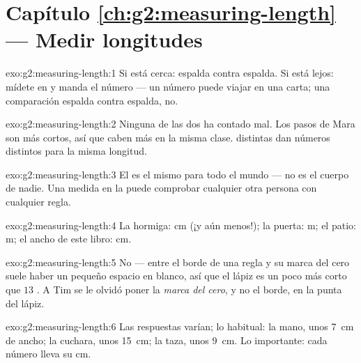 \section*{Capítulo \ref{ch:g2:measuring-length} --- Medir longitudes}

\begin{solution}{exo:g2:measuring-length:1}
Si está cerca: espalda contra espalda. Si está lejos: mídete en
 y manda el número --- un número puede viajar en una
carta; una comparación espalda contra espalda, no.
\end{solution}

\begin{solution}{exo:g2:measuring-length:2}
Ninguna de las dos ha contado mal. Los pasos de Mara son más cortos,
así que caben más en la misma clase.  distintas dan números
distintos para la misma longitud.
\end{solution}

\begin{solution}{exo:g2:measuring-length:3}
El  es el mismo para todo el mundo --- no es el cuerpo de
nadie. Una medida en  la puede comprobar cualquier otra
persona con cualquier regla.
\end{solution}

\begin{solution}{exo:g2:measuring-length:4}
La hormiga: \unit{cm} (¡y aún menos!); la puerta: \unit{m}; el patio:
\unit{m}; el ancho de este libro: \unit{cm}.
\end{solution}

\begin{solution}{exo:g2:measuring-length:5}
No --- entre el borde de una regla y su marca del cero suele haber un
pequeño espacio en blanco, así que el lápiz es un poco más corto que
$13$ . A Tim se le olvidó poner la \emph{marca del cero},
y no el borde, en la punta del lápiz.
\end{solution}

\begin{solution}{exo:g2:measuring-length:6}
Las respuestas varían; lo habitual: la mano, unos \qty{7}{cm} de
ancho; la cuchara, unos \qty{15}{cm}; la taza, unos \qty{9}{cm}. Lo
importante: cada número lleva su \unit{cm}.
\end{solution}

